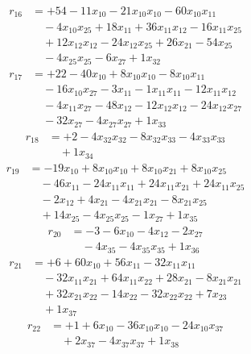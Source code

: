 \[\begin{aligned}
r_{16} &= + 54 - 11 x_{10} - 21 x_{10} x_{10} - 60 x_{10} x_{11} \\
 &\quad - 4 x_{10} x_{25} + 18 x_{11} + 36 x_{11} x_{12} - 16 x_{11} x_{25} \\
 &\quad + 12 x_{12} x_{12} - 24 x_{12} x_{25} + 26 x_{21} - 54 x_{25} \\
 &\quad - 4 x_{25} x_{25} - 6 x_{27} + 1 x_{32}
\end{aligned}\]
\[\begin{aligned}
r_{17} &= + 22 - 40 x_{10} + 8 x_{10} x_{10} - 8 x_{10} x_{11} \\
 &\quad - 16 x_{10} x_{27} - 3 x_{11} - 1 x_{11} x_{11} - 12 x_{11} x_{12} \\
 &\quad - 4 x_{11} x_{27} - 48 x_{12} - 12 x_{12} x_{12} - 24 x_{12} x_{27} \\
 &\quad - 32 x_{27} - 4 x_{27} x_{27} + 1 x_{33}
\end{aligned}\]
\[\begin{aligned}
r_{18} &= + 2 - 4 x_{32} x_{32} - 8 x_{32} x_{33} - 4 x_{33} x_{33} \\
 &\quad + 1 x_{34}
\end{aligned}\]
\[\begin{aligned}
r_{19} &= - 19 x_{10} + 8 x_{10} x_{10} + 8 x_{10} x_{21} + 8 x_{10} x_{25} \\
 &\quad - 46 x_{11} - 24 x_{11} x_{11} + 24 x_{11} x_{21} + 24 x_{11} x_{25} \\
 &\quad - 2 x_{12} + 4 x_{21} - 4 x_{21} x_{21} - 8 x_{21} x_{25} \\
 &\quad + 14 x_{25} - 4 x_{25} x_{25} - 1 x_{27} + 1 x_{35}
\end{aligned}\]
\[\begin{aligned}
r_{20} &= - 3 - 6 x_{10} - 4 x_{12} - 2 x_{27} \\
 &\quad - 4 x_{35} - 4 x_{35} x_{35} + 1 x_{36}
\end{aligned}\]
\[\begin{aligned}
r_{21} &= + 6 + 60 x_{10} + 56 x_{11} - 32 x_{11} x_{11} \\
 &\quad - 32 x_{11} x_{21} + 64 x_{11} x_{22} + 28 x_{21} - 8 x_{21} x_{21} \\
 &\quad + 32 x_{21} x_{22} - 14 x_{22} - 32 x_{22} x_{22} + 7 x_{23} \\
 &\quad + 1 x_{37}
\end{aligned}\]
\[\begin{aligned}
r_{22} &= + 1 + 6 x_{10} - 36 x_{10} x_{10} - 24 x_{10} x_{37} \\
 &\quad + 2 x_{37} - 4 x_{37} x_{37} + 1 x_{38}
\end{aligned}\]
